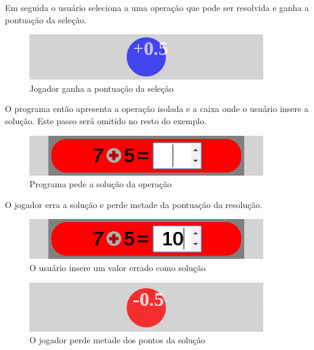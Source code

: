 Em seguida o usuário seleciona a uma operação que pode ser resolvida e ganha a pontuação da seleção.

\begin{figure}[H]
	\caption{\label{score_0_5_1}Jogador ganha a pontuação da seleção}
	\begin{center}
	    \includegraphics[scale=1]{score_0_5.png}
	\end{center}
\end{figure}

O programa então apresenta a operação isolada e a caixa onde o usuário insere a solução. Este passo será omitido no resto do exemplo.

\begin{figure}[H]
	\caption{\label{xp_2}Programa pede a solução da operação}
	\begin{center}
	    \includegraphics[scale=1]{xp_4_2_asksol_1.png}
	\end{center}
\end{figure}

O jogador erra a solução e perde metade da pontuação da resolução.

\begin{figure}[H]
	\caption{\label{xp_3}O usuário insere um valor errado como solução}
	\begin{center}
	    \includegraphics[scale=1]{xp_4_3_wrongans_1.png}
	\end{center}
\end{figure}

\begin{figure}[H]
	\caption{\label{miss_0_5_2}O jogador perde metade dos pontos da solução}
	\begin{center}
	    \includegraphics[scale=1]{miss_0_5.png}
	\end{center}
\end{figure}

